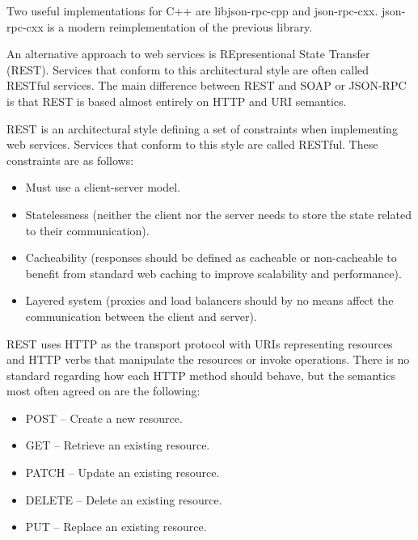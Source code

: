 Two useful implementations for C++ are libjson-rpc-cpp and json-rpc-cxx. json-rpc-cxx is a modern reimplementation of the previous library.


An alternative approach to web services is REpresentional State Transfer (REST). Services that conform to this architectural style are often called RESTful services. The main difference between REST and SOAP or JSON-RPC is that REST is based almost entirely on HTTP and URI semantics.

REST is an architectural style defining a set of constraints when implementing web services. Services that conform to this style are called RESTful. These constraints are as follows:

\begin{itemize}
\item 
Must use a client-server model.

\item 
Statelessness (neither the client nor the server needs to store the state related to their communication).

\item 
Cacheability (responses should be defined as cacheable or non-cacheable to benefit from standard web caching to improve scalability and performance).

\item 
Layered system (proxies and load balancers should by no means affect the communication between the client and server).
\end{itemize}

REST uses HTTP as the transport protocol with URIs representing resources and HTTP verbs that manipulate the resources or invoke operations. There is no standard regarding how each HTTP method should behave, but the semantics most often agreed on are the following:

\begin{itemize}
\item 
POST – Create a new resource.

\item 
GET – Retrieve an existing resource.

\item 
PATCH – Update an existing resource.

\item 
DELETE – Delete an existing resource.

\item 
PUT – Replace an existing resource.
\end{itemize}

